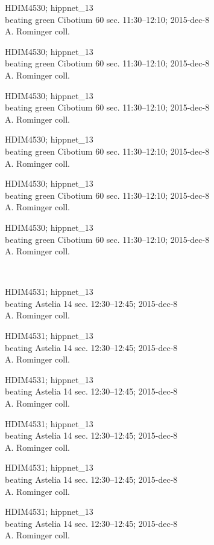 \documentclass[2pt]{extarticle}
\begin{document}
\noindent
\parbox{0.16\textwidth}{\tiny \raggedright \rule[-0.3\baselineskip]{0pt}{10pt}HDIM4530; hippnet\_13\\ beating green Cibotium 60 sec. 11:30--12:10; 2015-dec-8\\ A. Rominger coll.}
\parbox{0.16\textwidth}{\tiny \raggedright \rule[-0.3\baselineskip]{0pt}{10pt}HDIM4530; hippnet\_13\\ beating green Cibotium 60 sec. 11:30--12:10; 2015-dec-8\\ A. Rominger coll.}
\parbox{0.16\textwidth}{\tiny \raggedright \rule[-0.3\baselineskip]{0pt}{10pt}HDIM4530; hippnet\_13\\ beating green Cibotium 60 sec. 11:30--12:10; 2015-dec-8\\ A. Rominger coll.}
\parbox{0.16\textwidth}{\tiny \raggedright \rule[-0.3\baselineskip]{0pt}{10pt}HDIM4530; hippnet\_13\\ beating green Cibotium 60 sec. 11:30--12:10; 2015-dec-8\\ A. Rominger coll.}
\parbox{0.16\textwidth}{\tiny \raggedright \rule[-0.3\baselineskip]{0pt}{10pt}HDIM4530; hippnet\_13\\ beating green Cibotium 60 sec. 11:30--12:10; 2015-dec-8\\ A. Rominger coll.}
\parbox{0.16\textwidth}{\tiny \raggedright \rule[-0.3\baselineskip]{0pt}{10pt}HDIM4530; hippnet\_13\\ beating green Cibotium 60 sec. 11:30--12:10; 2015-dec-8\\ A. Rominger coll.} \\ 
\vspace{0.001in} 

\noindent
\parbox{0.16\textwidth}{\tiny \raggedright \rule[-0.3\baselineskip]{0pt}{10pt}HDIM4531; hippnet\_13\\ beating Astelia 14 sec. 12:30--12:45; 2015-dec-8\\ A. Rominger coll.}
\parbox{0.16\textwidth}{\tiny \raggedright \rule[-0.3\baselineskip]{0pt}{10pt}HDIM4531; hippnet\_13\\ beating Astelia 14 sec. 12:30--12:45; 2015-dec-8\\ A. Rominger coll.}
\parbox{0.16\textwidth}{\tiny \raggedright \rule[-0.3\baselineskip]{0pt}{10pt}HDIM4531; hippnet\_13\\ beating Astelia 14 sec. 12:30--12:45; 2015-dec-8\\ A. Rominger coll.}
\parbox{0.16\textwidth}{\tiny \raggedright \rule[-0.3\baselineskip]{0pt}{10pt}HDIM4531; hippnet\_13\\ beating Astelia 14 sec. 12:30--12:45; 2015-dec-8\\ A. Rominger coll.}
\parbox{0.16\textwidth}{\tiny \raggedright \rule[-0.3\baselineskip]{0pt}{10pt}HDIM4531; hippnet\_13\\ beating Astelia 14 sec. 12:30--12:45; 2015-dec-8\\ A. Rominger coll.}
\parbox{0.16\textwidth}{\tiny \raggedright \rule[-0.3\baselineskip]{0pt}{10pt}HDIM4531; hippnet\_13\\ beating Astelia 14 sec. 12:30--12:45; 2015-dec-8\\ A. Rominger coll.} \\ 
\vspace{0.001in} 
\end{document}
